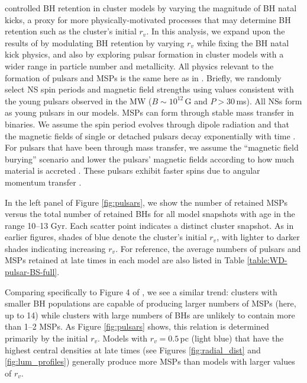 \documentclass[twocolumn,tighten]{aastex63}
\begin{document}
\citet{Ye2018} controlled BH retention in cluster models by varying the magnitude of BH natal kicks, a proxy for more physically-motivated processes that may determine BH retention such as the cluster's initial $r_v$. In this analysis, we expand upon the results of \citet{Ye2018} by modulating BH retention by varying $r_v$ while fixing the BH natal kick physics, and also by exploring pulsar formation in cluster models with a wider range in particle number and metallicity. All physics relevant to the formation of pulsars and MSPs is the same here as in \citet{Ye2018}. Briefly, we randomly select NS spin periods and magnetic field strengths using values consistent with the young pulsars observed in the MW ($B\sim10^{12}\,$G and $P>30\,$ms). All NSs form as young pulsars in our models. MSPs can form through stable mass transfer in binaries. We assume the spin period evolves through dipole radiation and that the magnetic fields of single or detached pulsars decay exponentially with time \citep{Kiel2008}.  For pulsars that have been through mass transfer, we assume the ``magnetic field burying'' scenario and lower the pulsars' magnetic fields according to how much material is accreted \citep{Kiel2008}. These pulsars exhibit faster spins due to angular momentum transfer \citep{Hurley2002}.

In the left panel of Figure \ref{fig:pulsars}, we show the number of retained MSPs versus the total number of retained BHs for all model snapshots with age in the range 10--13 Gyr. Each scatter point indicates a distinct cluster snapshot. As in earlier figures, shades of blue denote the cluster's initial $r_v$, with lighter to darker shades indicating increasing $r_v$. For reference, the average numbers of pulsars and MSPs retained at late times in each model are also listed in Table \ref{table:WD-pulsar-BS-full}.

Comparing specifically to Figure 4 of \citet{Ye2018}, we see a similar trend: clusters with smaller BH populations are capable of producing larger numbers of MSPs (here, up to 14) while clusters with large numbers of BHs are unlikely to contain more than 1--2 MSPs. As Figure \ref{fig:pulsars} shows, this relation is determined primarily by the initial $r_v$. Models with $r_v=0.5\,$pc (light blue) that have the highest central densities at late times (see Figures \ref{fig:radial_dist} and \ref{fig:lum_profiles}) generally produce more MSPs than models with larger values of $r_v$.
\end{document}
